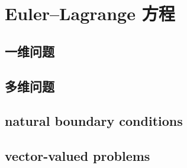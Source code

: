 \section{Euler–Lagrange 方程}
\label{b2:sec:1402}


\subsection{一维问题}
\label{b2:subsec:140201}

\subsection{多维问题}
\label{b2:subsec:140202}

\subsection{natural boundary conditions}
\label{b2:subsec:140203}

\subsection{vector-valued problems}
\label{b2:subsec:140204}


